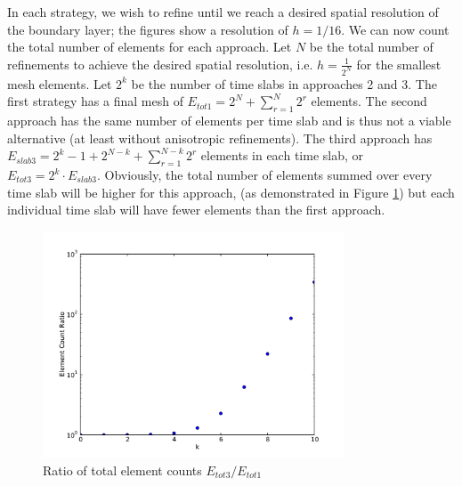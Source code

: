 \documentclass[Dissertation.tex]{subfiles}
\begin{document}
In each strategy, we wish to refine until we reach a desired spatial resolution of the boundary layer; the figures show a resolution of $h=1/16$.
We can now count the total number of elements for each approach. 
Let $N$ be the total number of refinements to achieve the desired spatial resolution, i.e. $h=\frac{1}{2^N}$
for the smallest mesh elements.
Let $2^k$ be the number of time slabs in approaches 2 and 3.
The first strategy has a final mesh of 
$
E_{tot1}=2^N+\sum_{r=1}^N 2^r
$
elements.
The second approach has the same number of elements per time slab and is thus not a viable alternative 
(at least without anisotropic refinements).
The third approach has
$  
E_{slab3}=2^{k}-1+2^{N-k}+\sum_{r=1}^{N-k}2^r
$
elements in each time slab, or $E_{tot3}=2^k\cdot E_{slab3}$.
Obviously, the total number of elements summed over every time slab will be higher for this approach, 
(as demonstrated in Figure \ref{fig:ElementCountRatio})
but each individual time slab will have fewer elements than the first approach.

\begin{figure}
\centering
\includegraphics[width=0.8\textwidth]{Dissertation/Scaling/RatioElementCount.pdf}
\caption{Ratio of total element counts $E_{tot3}/E_{tot1}$}
\label{fig:ElementCountRatio}
\end{figure}
\end{document}
